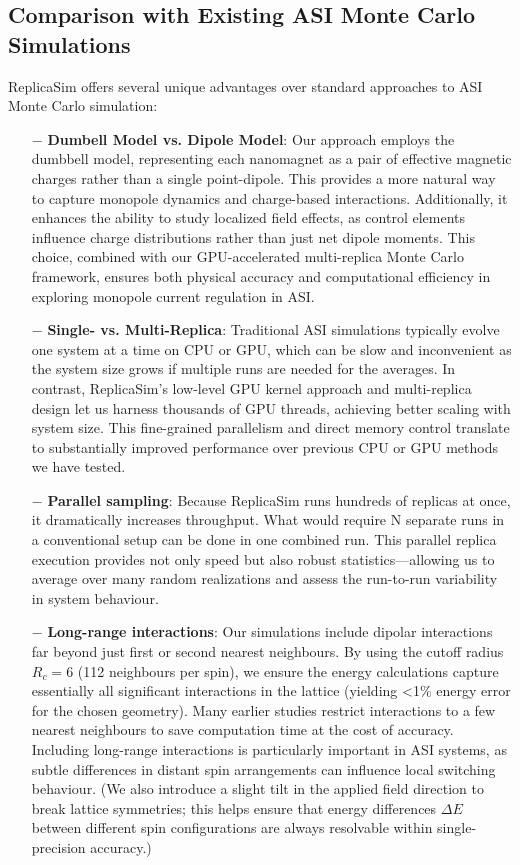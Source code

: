 \documentclass[journal=nalefd,manuscript=letter]{achemso}
\begin{document}
\subsection{Comparison with Existing ASI Monte Carlo Simulations}
ReplicaSim offers several unique advantages over standard approaches to ASI Monte Carlo simulation:
\begin{itemize}

\item [$-$] \textbf{Dumbell Model vs. Dipole Model}: Our approach employs the dumbbell model, representing each nanomagnet as a pair of effective magnetic charges rather than a single point-dipole. This provides a more natural way to capture monopole dynamics and charge-based interactions. Additionally, it enhances the ability to study localized field effects, as control elements influence charge distributions rather than just net dipole moments. This choice, combined with our GPU-accelerated multi-replica Monte Carlo framework, ensures both physical accuracy and computational efficiency in exploring monopole current regulation in ASI.
\item [$-$] \textbf{Single- vs. Multi-Replica}: Traditional ASI simulations typically evolve one system at a time on CPU or GPU, which can be slow and inconvenient as the system size grows if multiple runs are needed for the averages.  In contrast, ReplicaSim’s low-level GPU kernel approach and multi-replica design let us harness thousands of GPU threads, achieving better scaling with system size. This fine-grained parallelism and direct memory control translate to substantially improved performance over previous CPU or GPU methods we have tested.
\item [$-$] \textbf{Parallel sampling}: Because ReplicaSim runs hundreds of replicas at once, it dramatically increases throughput. What would require N separate runs in a conventional setup can be done in one combined run. This parallel replica execution provides not only speed but also robust statistics—allowing us to average over many random realizations and assess the run-to-run variability in system behaviour.
\item [$-$] \textbf{Long-range interactions}: Our simulations include dipolar interactions far beyond just first or second nearest neighbours. By using the cutoff radius $R_c=6$ (112 neighbours per spin), we ensure the energy calculations capture essentially all significant interactions in the lattice (yielding <1\% energy error for the chosen geometry). Many earlier studies restrict interactions to a few nearest neighbours to save computation time at the cost of accuracy. Including long-range interactions is particularly important in ASI systems, as subtle differences in distant spin arrangements can influence local switching behaviour. (We also introduce a slight tilt in the applied field direction to break lattice symmetries; this helps ensure that energy differences $\Delta E$ between different spin configurations are always resolvable within single-precision accuracy.)

\end{itemize}
\end{document}
